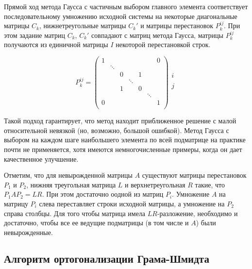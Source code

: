 Прямой ход метода Гаусса с частичным выбором главного элемента
соответствует последовательному умножению исходной системы на
некоторые диагональные матрицы $C_k$, нижнетреугольные матрицы
$C_k'$ и матрицы перестановок $P_k^{ij}$. При этом задание матриц
$C_k$, $C_k'$ совпадают с матриц метода Гаусса, матрицы $P_k^{ij}$ получаются из единичной матрицы $I$
некоторой перестановкой строк.

\[P_k^{ij}=\left(\begin{array}{ccccccc}
      1 &        &   &        &   &        & 0 \\
        & \ddots &   &        &   &        &   \\
        &        & 0 &        & 1 &        &   \\
        &        &   & \ddots &   &        &   \\
        &        & 1 &        & 0 &        &   \\
        &        &   &        &   & \ddots &   \\
      0 &        &   &        &   &        & 1 \\
    \end{array}\right)
  \begin{array}{c}
    \\
    \\
    i \\
    \\
    j \\
    \\
    \\
  \end{array}
\]

Такой подход гарантирует, что метод находит приближенное решение с
малой относительной невязкой (но, возможно, большой ошибкой). Метод
Гаусса с выбором на каждом шаге наибольшего элемента по всей подматрице
на практике почти не применяется, хотя имеются немногочисленные
примеры, когда он дает качественное улучшение.

Отметим, что для невырожденной матрицы $A$ существуют матрицы перестановок
$P_1$ и $P_2$, нижняя треугольная матрица $L$ и верхнетреугольная
$R$ такие, что $P_1AP_2=LR$. При этом достаточно оодной из матриц
$P_i$. Умножение $A$ на матрицу $P_i$ слева переставляет строки исходной
матрицы, а умножение на $P_2$ справа  столбцы. Для того чтобы матрица
имела $LR$-разложение, необходимо и достаточно, чтобы все ее ведущие подматрицы
(в том числе и $A$) были невырожденные.

\newpage
\subsection*{Алгоритм ортогонализации Грама-Шмидта}

